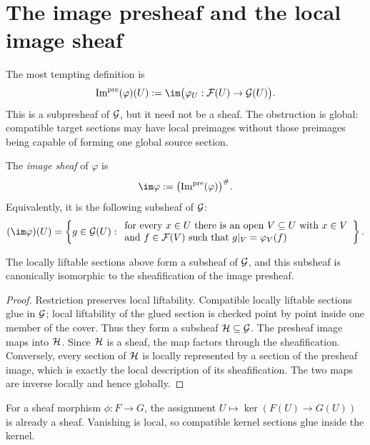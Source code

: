 

\section{The image presheaf and the local image sheaf}

The most tempting definition is
\[
\operatorname{Im}^{\mathrm{pre}}(\varphi)(U)
:=\im\bigl(\varphi_U:\F(U)\to\G(U)\bigr).
\]
This is a subpresheaf of $\mathcal G$, but it need not be a sheaf.  The obstruction is global:
compatible target sections may have local preimages without those preimages being capable of
forming one global source section.

\begin{definition}
The \emph{image sheaf} of $\varphi$ is
\[
\im\varphi:=\bigl(\operatorname{Im}^{\mathrm{pre}}(\varphi)\bigr)^\#.
\]
Equivalently, it is the following subsheaf of $\mathcal G$:
\[
(\im\varphi)(U)=
\left\{g\in\G(U):
\begin{array}{l}
\text{for every }x\in U\text{ there is an open }V\subseteq U\text{ with }x\in V\\
\text{and }f\in\F(V)\text{ such that }g|_V=\varphi_V(f)
\end{array}
\right\}.
\]
\end{definition}

\begin{theorem}
The locally liftable sections above form a subsheaf of $\mathcal G$, and this subsheaf is canonically
isomorphic to the sheafification of the image presheaf.
\end{theorem}
\begin{proof}
Restriction preserves local liftability.  Compatible locally liftable sections glue in
$\mathcal G$; local liftability of the glued section is checked point by point inside one member of
the cover.  Thus they form a subsheaf $\mathcal H\subseteq\mathcal G$.  The presheaf image maps into
$\mathcal H$.  Since $\mathcal H$ is a sheaf, the map factors through the sheafification.  Conversely,
every section of $\mathcal H$ is locally represented by a section of the presheaf image, which is
exactly the local description of its sheafification.  The two maps are inverse locally and
hence globally.
\end{proof}



\begin{example}\label{ex:vi15-expand-01}
For a sheaf morphism $\phi:F\to G$, the assignment $U\mapsto\ker(F(U)\to G(U))$ is already a sheaf.  Vanishing is local, so compatible kernel sections glue inside the kernel.
\end{example}
